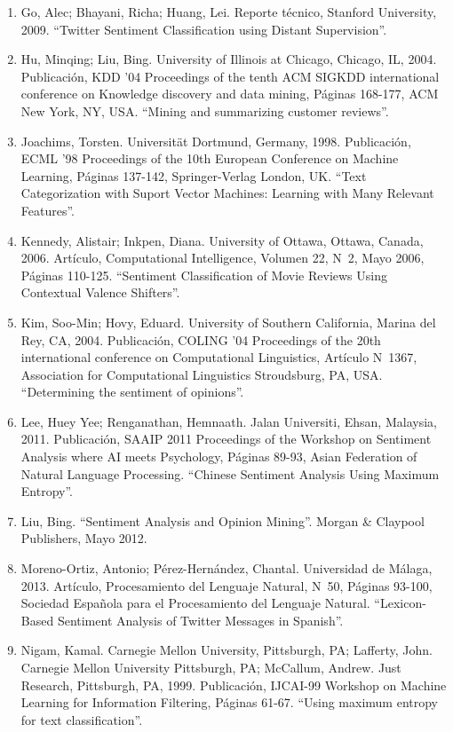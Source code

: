 \begin{enumerate}
\item Go, Alec; Bhayani, Richa; Huang, Lei. Reporte t\'ecnico, Stanford University, 2009. ``Twitter Sentiment Classification using Distant Supervision''.
\item Hu, Minqing; Liu, Bing. University of Illinois at Chicago, Chicago, IL, 2004. Publicaci\'on, KDD '04 Proceedings of the tenth ACM SIGKDD international conference on Knowledge discovery and data mining, P\'aginas 168-177, ACM New York, NY, USA. ``Mining and summarizing customer reviews''.
\item Joachims, Torsten. Universit\"at Dortmund, Germany, 1998. Publicaci\'on, ECML '98 Proceedings of the 10th European Conference on Machine Learning, P\'aginas 137-142, Springer-Verlag London, UK. ``Text Categorization with Suport Vector Machines: Learning with Many Relevant Features''.
\item Kennedy, Alistair; Inkpen, Diana. University of Ottawa, Ottawa, Canada, 2006. Art\'iculo, Computational Intelligence, Volumen 22, N\grado\ 2, Mayo 2006, P\'aginas 110-125. ``Sentiment Classification of Movie Reviews Using Contextual Valence Shifters''.
\item Kim, Soo-Min; Hovy, Eduard. University of Southern California, Marina del Rey, CA, 2004. Publicaci\'on, COLING '04 Proceedings of the 20th international conference on Computational Linguistics, Art\'iculo N\grado \ 1367, Association for Computational Linguistics Stroudsburg, PA, USA. ``Determining the sentiment of opinions''.
\item Lee, Huey Yee; Renganathan, Hemnaath. Jalan Universiti, Ehsan, Malaysia, 2011. Publicaci\'on, SAAIP 2011 Proceedings of the Workshop on Sentiment Analysis where AI meets Psychology, P\'aginas 89-93, Asian Federation of Natural Language Processing. ``Chinese Sentiment Analysis Using Maximum Entropy''.
\item Liu, Bing. ``Sentiment Analysis and Opinion Mining''. Morgan \& Claypool Publishers, Mayo 2012.
\item Moreno-Ortiz, Antonio; P\'erez-Hern\'andez, Chantal. Universidad de M\'alaga, 2013. Art\'iculo, Procesamiento del Lenguaje Natural, N\grado\ 50, P\'aginas 93-100, Sociedad Espa\~nola para el Procesamiento del Lenguaje Natural. ``Lexicon-Based Sentiment Analysis of Twitter Messages in Spanish''.
\item Nigam, Kamal. Carnegie Mellon University, Pittsburgh, PA; Lafferty, John. Carnegie Mellon University Pittsburgh, PA; McCallum, Andrew. Just Research, Pittsburgh, PA, 1999. Publicaci\'on, IJCAI-99 Workshop on Machine Learning for Information Filtering, P\'aginas 61-67. ``Using maximum entropy for text classification''.

\end{enumerate}
